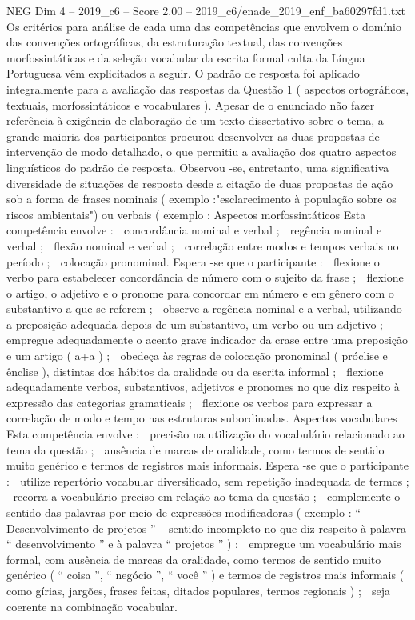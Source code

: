 \begin{textsample}{NEG Dim 4 – 2019\_c6 – Score 2.00 – 2019\_c6/enade\_2019\_enf\_ba60297fd1.txt}
Os critérios para análise de cada uma das competências que envolvem o domínio das convenções ortográficas, da estruturação textual, das convenções morfossintáticas e da seleção vocabular da escrita formal culta da Língua Portuguesa vêm explicitados a seguir.
O padrão de resposta foi aplicado integralmente para a avaliação das respostas da Questão 1 ( aspectos ortográficos, textuais, morfossintáticos e vocabulares ).
Apesar de o enunciado não fazer referência à exigência de elaboração de um texto dissertativo sobre o tema, a grande maioria dos participantes procurou desenvolver as duas propostas de intervenção de modo detalhado, o que permitiu a avaliação dos quatro aspectos linguísticos do padrão de resposta.
Observou -se, entretanto, uma significativa diversidade de situações de resposta desde a citação de duas propostas de ação sob a forma de frases nominais ( exemplo :"esclarecimento à população sobre os riscos ambientais") ou verbais ( exemplo : Aspectos morfossintáticos Esta competência envolve :  concordância nominal e verbal ;  regência nominal e verbal ;  flexão nominal e verbal ;  correlação entre modos e tempos verbais no período ;  colocação pronominal.
Espera -se que o participante :  flexione o verbo para estabelecer concordância de número com o sujeito da frase ;  flexione o artigo, o adjetivo e o pronome para concordar em número e em gênero com o substantivo a que se referem ;  observe a regência nominal e a verbal, utilizando a preposição adequada depois de um substantivo, um verbo ou um adjetivo ;  empregue adequadamente o acento grave indicador da crase entre uma preposição e um artigo ( a+a ) ;  obedeça às regras de colocação pronominal ( próclise e ênclise ), distintas dos hábitos da oralidade ou da escrita informal ;  flexione adequadamente verbos, substantivos, adjetivos e pronomes no que diz respeito à expressão das categorias gramaticais ;  flexione os verbos para expressar a correlação de modo e tempo nas estruturas subordinadas.
Aspectos vocabulares Esta competência envolve :  precisão na utilização do vocabulário relacionado ao tema da questão ;  ausência de marcas de oralidade, como termos de sentido muito genérico e termos de registros mais informais.
Espera -se que o participante :  utilize repertório vocabular diversificado, sem repetição inadequada de termos ;  recorra a vocabulário preciso em relação ao tema da questão ;  complemente o sentido das palavras por meio de expressões modificadoras ( exemplo : “ Desenvolvimento de projetos ” – sentido incompleto no que diz respeito à palavra “ desenvolvimento ” e à palavra “ projetos ” ) ;  empregue um vocabulário mais formal, com ausência de marcas da oralidade, como termos de sentido muito genérico ( “ coisa ”, “ negócio ”, “ você ” ) e termos de registros mais informais ( como gírias, jargões, frases feitas, ditados populares, termos regionais ) ;  seja coerente na combinação vocabular.

\end{textsample}
